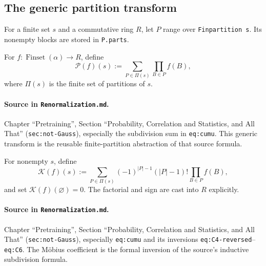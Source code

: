 \subsection{The generic partition transform}

For a finite set $s$ and a commutative ring $R$, let $P$ range over
\texttt{Finpartition s}.  Its nonempty blocks are stored in \texttt{P.parts}.

\begin{definition}
\label{def:renorm:partitionTransform}
For $f:\operatorname{Finset}(\alpha)\to R$, define
\[
  \mathcal P(f)(s)
  :=\sum_{P\in\Pi(s)}\prod_{B\in P}f(B),
\]
where $\Pi(s)$ is the finite set of partitions of $s$.

\paragraph{Source in \texttt{Renormalization.md}.}
Chapter ``Pretraining'', Section ``Probability, Correlation and Statistics, and All That''
(\texttt{sec:not-Gauss}), especially the subdivision sum in \texttt{eq:cumu}.  This generic
transform is the reusable finite-partition abstraction of that source formula.
\end{definition}

\begin{definition}
\label{def:renorm:cumulantTransform}
For nonempty $s$, define
\[
  \mathcal K(f)(s)
  :=\sum_{P\in\Pi(s)}
       (-1)^{|P|-1}(|P|-1)!\prod_{B\in P}f(B),
\]
and set $\mathcal K(f)(\varnothing)=0$.
The factorial and sign are cast into $R$ explicitly.

\paragraph{Source in \texttt{Renormalization.md}.}
Chapter ``Pretraining'', Section ``Probability, Correlation and Statistics, and All That''
(\texttt{sec:not-Gauss}), especially \texttt{eq:cumu} and its inversions
\texttt{eq:C4-reversed}--\texttt{eq:C6}.  The M\"obius coefficient is the formal inversion of the
source's inductive subdivision formula.
\end{definition}

